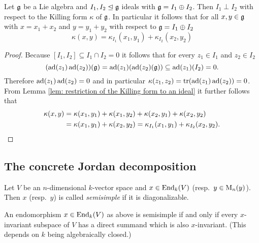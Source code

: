 \begin{lem}\label{lem: orthogonal ideals with respect to the killing form}
 Let $\mathfrak{g}$ be a Lie algebra and $I_1, I_2 \trianglelefteq \mathfrak{g}$ ideals with $\mathfrak{g} = I_1 \oplus I_2$. Then $I_1 \perp I_2$ with respect to the Killing form $\kappa$ of $\mathfrak{g}$. In particular it follows that for all $x,y \in \mathfrak{g}$ with $x = x_1 + x_2$ and $y = y_1 + y_2$ with respect to $\mathfrak{g} = I_1 \oplus I_2$
 \[
  \kappa(x,y) = \kappa_{I_1}(x_1, y_1) + \kappa_{I_2}(x_2, y_2)
 \]
\end{lem}
\begin{proof}
 Because $[I_1, I_2] \subseteq I_1 \cap I_2 = 0$ it follows that for every $z_1 \in I_1$ and $z_2 \in I_2$
 \[
  (\operatorname{ad}(z_1)\operatorname{ad}(z_2))(\mathfrak{g}) = \operatorname{ad}(z_1)(\operatorname{ad}(z_2)(\mathfrak{g})) \subseteq \operatorname{ad}(z_1)(I_2) = 0.
 \]
 Therefore $\operatorname{ad}(z_1)\operatorname{ad}(z_2) = 0$ and in particular $\kappa(z_1,z_2) = \operatorname{tr}(\operatorname{ad}(z_1)\operatorname{ad}(z_2)) = 0$. From Lemma \ref{lem: restriction of the Killing form to an ideal} it further follows that
 \begin{align*}
  \kappa(x,y)
  &= \kappa(x_1, y_1) + \kappa(x_1, y_2) + \kappa(x_2, y_1) + \kappa(x_2, y_2) \\
  &= \kappa(x_1, y_1) + \kappa(x_2, y_2)
  = \kappa_{I_1}(x_1, y_1) + \kappa_{I_2}(x_2, y_2).
  \qedhere
 \end{align*}
\end{proof}





\subsection{The concrete Jordan decomposition}


\begin{defi}
 Let $V$ be an $n$-dimensional $k$-vector space and $x \in \operatorname{End}_k(V)$ (resp.\ $y \in \operatorname{M}_n(y)$). Then $x$ (resp.\ $y$) is called \emph{semisimple} if it is diagonalizable.
\end{defi}


\begin{rem}
 An endomorphism $x \in \operatorname{End}_k(V)$ as above is semisimple if and only if every $x$-invariant subspace of $V$ has a direct summand which is also $x$-invariant. (This depends on $k$ being algebraically closed.)
\end{rem}


